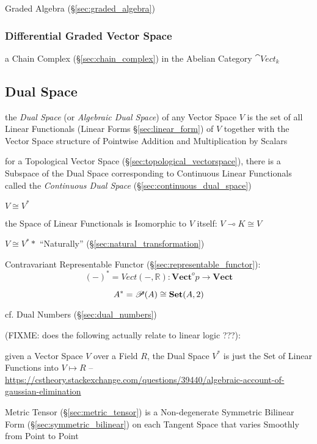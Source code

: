 Graded Algebra (\S\ref{sec:graded_algebra})



\subsubsection{Differential Graded Vector Space}\label{sec:differential_graded}

a Chain Complex (\S\ref{sec:chain_complex}) in the Abelian Category
$\cat{Vect}_k$



\subsection{Dual Space}\label{sec:dual_space}

the \emph{Dual Space} (or \emph{Algebraic Dual Space}) of any Vector Space $V$
is the set of all Linear Functionals (Linear Forms \S\ref{sec:linear_form}) of
$V$ together with the Vector Space structure of Pointwise Addition and
Multiplication by Scalars

for a Topological Vector Space (\S\ref{sec:topological_vectorspace}), there is
a Subspace of the Dual Space corresponding to Continuous Linear Functionals
called the \emph{Continuous Dual Space} (\S\ref{sec:continuous_dual_space})

$V \cong V^*$

the Space of Linear Functionals is Isomorphic to $V$ itself:
$V \multimap K \cong V$

$V \cong V^**$ ``Naturally'' (\S\ref{sec:natural_transformation})

Contravariant Representable Functor
(\S\ref{sec:representable_functor}):
\[
  (-)^* = Vect(-,\mathbb{R}) :
    \mathbf{Vect}^op \rightarrow \mathbf{Vect}
\]

\[
  A^* = \mathscr{P}(A) \cong \mathbf{Set}(A,2)
\]\cite{awodey06}

cf. Dual Numbers (\S\ref{sec:dual_numbers})

(FIXME: does the following actually relate to linear logic ???):

given a Vector Space $V$ over a Field $R$, the Dual Space $V^*$ is just the Set
of Linear Functions into $V \mapsto R$
--\url{https://cstheory.stackexchange.com/questions/39440/algebraic-account-of-gaussian-elimination}

Metric Tensor (\S\ref{sec:metric_tensor}) is a Non-degenerate Symmetric Bilinear
Form (\S\ref{sec:symmetric_bilinear}) on each Tangent Space that varies Smoothly
from Point to Point

